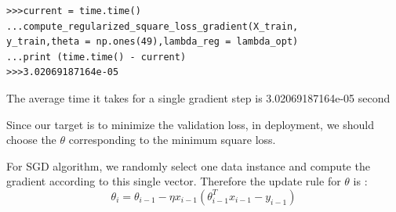 \documentclass{article}
\newenvironment{problem}[2][$\bullet$]{\begin{trivlist}\large
		\item[\hskip \labelsep {\bfseries #1}\hskip \labelsep {\bfseries #2.}]}  {\end{trivlist}}
\newenvironment{sub}[2][$-$]{\begin{trivlist}
		\item[\hskip \labelsep {\bfseries #1}\hskip \labelsep {\bfseries #2.}]}  {\end{trivlist}}
\begin{document}
\begin{verbatim}
>>>current = time.time()
...compute_regularized_square_loss_gradient(X_train,
y_train,theta = np.ones(49),lambda_reg = lambda_opt)
...print (time.time() - current)
>>>3.02069187164e-05
\end{verbatim}

The average time it takes for a single gradient step is 3.02069187164e-05 second

\begin{sub}{2.5.8}
\end{sub}

Since our target is to minimize the validation loss, in deployment, we should choose the $\theta$ corresponding to the minimum square loss.





\begin{problem}{2.6 Stochastic Gradient Decent}
\end{problem}

\begin{sub}{2.6.1}
\end{sub}

For SGD algorithm, we randomly select one data instance and compute the gradient according to this single vector. Therefore the update rule for $\theta$ is :\\
$$\theta_{i} = \theta_{i-1} - \eta x_{i-1} (\theta_{i-1}^Tx_{i-1}-y_{i-1} ) $$

\begin{sub}{2.6.2}
\end{sub}
\end{document}
